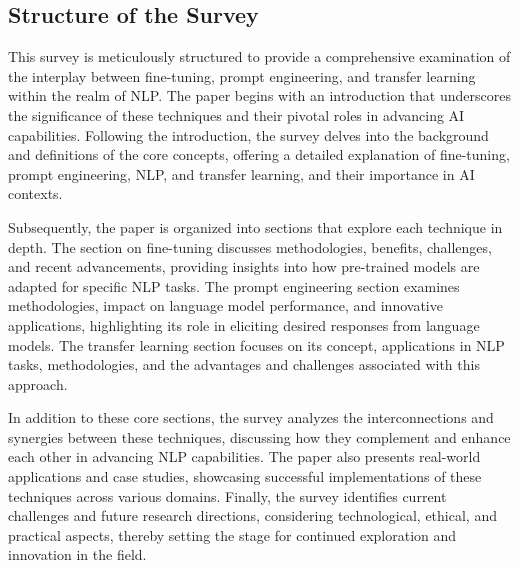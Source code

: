 \subsection{Structure of the Survey} \label{subsec:Structure of the Survey}



This survey is meticulously structured to provide a comprehensive examination of the interplay between fine-tuning, prompt engineering, and transfer learning within the realm of NLP. The paper begins with an introduction that underscores the significance of these techniques and their pivotal roles in advancing AI capabilities. Following the introduction, the survey delves into the background and definitions of the core concepts, offering a detailed explanation of fine-tuning, prompt engineering, NLP, and transfer learning, and their importance in AI contexts.



Subsequently, the paper is organized into sections that explore each technique in depth. The section on fine-tuning discusses methodologies, benefits, challenges, and recent advancements, providing insights into how pre-trained models are adapted for specific NLP tasks. The prompt engineering section examines methodologies, impact on language model performance, and innovative applications, highlighting its role in eliciting desired responses from language models. The transfer learning section focuses on its concept, applications in NLP tasks, methodologies, and the advantages and challenges associated with this approach.



In addition to these core sections, the survey analyzes the interconnections and synergies between these techniques, discussing how they complement and enhance each other in advancing NLP capabilities. The paper also presents real-world applications and case studies, showcasing successful implementations of these techniques across various domains. Finally, the survey identifies current challenges and future research directions, considering technological, ethical, and practical aspects, thereby setting the stage for continued exploration and innovation in the field.



